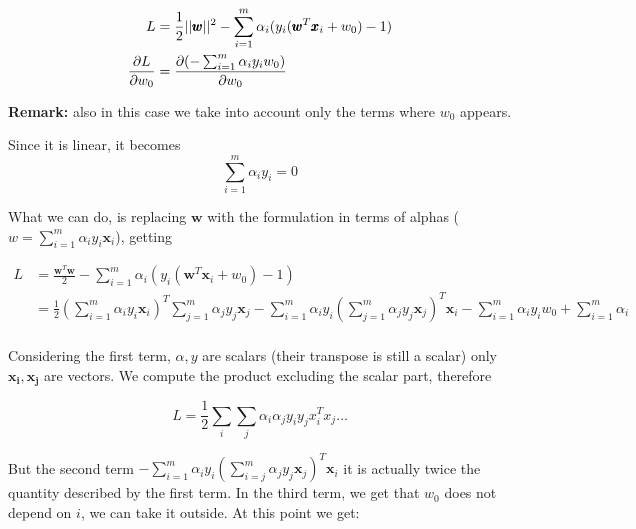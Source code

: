             \begin{align*}
                L &= \frac{1}{2} ||\pmb{w}||^2 - 
                    \sum_{i=1}^m \alpha_i (y_i (\pmb{w}^T \pmb{x}_i + w_0) - 1)\\
                \pdv{L} {w_0} &= \pdv{(- \sum_{i=1}^m \alpha_i y_i w_0)}{w_0}\\
            \end{align*}
            
            \textbf{Remark:} also in this case we take into account only the terms where $w_0$ appears. \newline
            
            Since it is linear, it becomes
            \begin{equation}
                \sum_{i=1}^m \alpha_i y_i = 0
                \label{ref:second important result}
            \end{equation}

            What we can do, is replacing $\pmb{w}$ with the formulation in terms of alphas ($w = \sum_{i=1}^m \alpha_i y_i \pmb{x}_i$), getting

            \begin{align*}
                L &= \frac{\pmb{w}^T \pmb{w}}{2}  - 
                    \sum_{i=1}^m \alpha_i (y_i (\pmb{w}^T \pmb{x}_i + w_0) - 1)\\
                & = \frac{1}{2} \left( \sum_{i=1}^m \alpha_i y_i \pmb{x}_i \right)^T {\sum_{j=1}^m \alpha_j y_j \pmb{x}_j}  - 
                    \sum_{i=1}^m \alpha_i y_i (\sum_{j=1}^m \alpha_j y_j \pmb{x}_j)^T \pmb{x}_i - \sum_{i=1}^m \alpha_i y_i w_0 + \sum_{i=1}^m \alpha_i \\
            \end{align*}
            
            Considering the first term,  $\alpha, y$ are scalars (their transpose is still a scalar) only $\pmb{x_i}, \pmb{x_j}$ are vectors. 
            We compute the product excluding the scalar part, therefore
            
            $$L = \frac{1}{2} \sum_{i} \sum_{j} \alpha_i \alpha_j y_i y_j x_i ^T x_j \dots$$
            
            But the second term $ -\sum_{i=1}^m \alpha_i y_i (\sum_{i=j}^m \alpha_j y_j \pmb{x}_j)^T \pmb{x}_i$ it is actually twice the quantity described by the first term.
            In the third term, we get that $w_0$ does not depend on $i$, we can take it outside.
            At this point we get:
            
